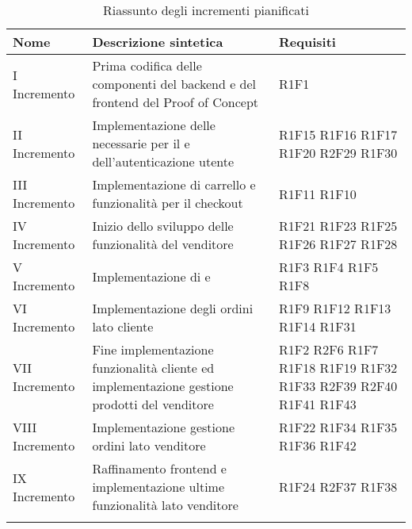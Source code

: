 \begin{center}
	\begin{longtable}{|p{2.5cm}|p{6.5cm}|p{6cm}|}
		\hline
		\rowcolor{lighter-grayer}
		\textbf{Nome}  & \textbf{Descrizione sintetica}                                                & \textbf{Requisiti} \\
		\hline
		\endfirsthead
		\hline
		\hline
		\endfoot
		\endlastfoot
		\hline
		I Incremento   & Prima codifica delle componenti del backend e del frontend del Proof of Concept & R1F1 \\
		II Incremento  & Implementazione delle \glock{API} necessarie per il \glock{PoC} e dell'autenticazione utente & R1F15 R1F16 R1F17 R1F20 R2F29 R1F30 \\
		III Incremento & Implementazione di carrello e funzionalità per il checkout   & R1F11 R1F10 \\
		IV Incremento  & Inizio dello sviluppo delle funzionalità del venditore & R1F21 R1F23 R1F25 R1F26 R1F27 R1F28          \\
		V Incremento   & Implementazione di \glock{PLP} e \glock{PDP}  & R1F3 R1F4 R1F5 R1F8 \\
		VI Incremento   & Implementazione degli ordini lato cliente   & R1F9 R1F12 R1F13 R1F14 R1F31 \\
		VII Incremento   & Fine implementazione funzionalità cliente ed implementazione gestione prodotti del venditore     &  R1F2 R2F6 R1F7 R1F18 R1F19 R1F32 R1F33 R2F39 R2F40 R1F41 R1F43\\
		VIII Incremento   & Implementazione gestione ordini lato venditore & R1F22 R1F34 R1F35 R1F36 R1F42 \\
		IX Incremento   & Raffinamento frontend e implementazione ultime funzionalità lato venditore & R1F24  R2F37 R1F38  \\
		
		 \hline
		\rowcolor{white}
		\caption{Riassunto degli incrementi pianificati}
	\end{longtable}
\end{center}